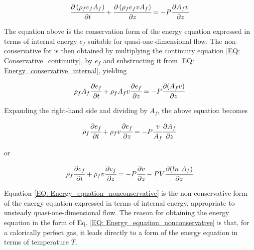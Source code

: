 \documentclass[../Article_Model_Parameters.tex]{subfiles}
\begin{document}
	{\footnotesize
		\begin{equation}
			\cfrac{\partial \left( \rho_f e_f A_f \right) }{\partial t} + \cfrac{\partial \left( \rho_f  e_f v A_f \right)}{\partial z} = -P \cfrac{\partial A_f v}{\partial z}
			\label{EQ: Energy_conservative_internal}
		\end{equation}
	}
	
	The equation above is the conservation form of the energy equation expressed in terms of internal energy $e_f$ suitable for quasi-one-dimensional flow. The non-conservative for is then obtained by multiplying the continuity equation \ref{EQ: Conservative_continuity}, by $e_f$ and substructing it from \ref{EQ: Energy_conservative_internal}, yielding 
	
	{\footnotesize
		\begin{equation}
			\rho_f A_f \cfrac{\partial e_f}{\partial t} + \rho_f A_f v \cfrac{\partial e_f}{\partial z} = - P \cfrac{\partial (A_f v) }{\partial z}
		\end{equation}
	}
	
	Expanding the right-hand side and dividing by $A_f$, the above equation becomes 
	
	{\footnotesize
		\begin{equation}
			\rho_f \cfrac{\partial e_f}{\partial t} + \rho_f v \cfrac{\partial e_f}{\partial z} = -P \cfrac{v}{A_f} \cfrac{\partial A_f}{\partial z}
		\end{equation}
	}

	or
	
	{\footnotesize
		\begin{equation}
			\rho_f \cfrac{\partial e_f}{\partial t} + \rho_f v \cfrac{\partial e_f}{\partial z} = -P \cfrac{\partial v}{\partial z} - P V \cfrac{\partial (ln~A_f)}{\partial z}
			\label{EQ: Energy_equation_nonconservative}
		\end{equation}
	}
	
	Equation \ref{EQ: Energy_equation_nonconservative} is the non-conservative form of the energy equation expressed in terms of internal energy, appropriate to unsteady quasi-one-dimensional flow. The reason for obtaining the energy equation in the form of Eq. \ref{EQ: Energy_equation_nonconservative} is that, for a calorically perfect gas, it leads directly to a form of the energy equation in terms of temperature $T$. 
%	
%	
%	
	
	
	
	
	
	
	
	
	
	
	
	
	
	
	
\end{document}
